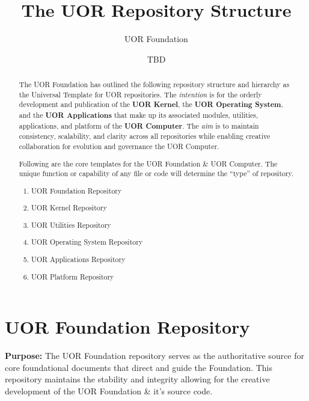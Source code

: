 \documentclass{article}
\title{The UOR Repository Structure}
\author{UOR Foundation}
\date{TBD}
\begin{document}
\maketitle

\begin{abstract}
The UOR Foundation has outlined the following repository structure and hierarchy as the Universal Template for UOR repositories.
The \textit{intention} is for the orderly development and publication of the \textbf{UOR Kernel}, the \textbf{UOR Operating System}, and the \textbf{UOR Applications} that make up its associated modules, utilities, applications, and platform of the \textbf{UOR Computer}.
The \textit{aim} is to maintain consistency, scalability, and clarity across all repositories while enabling creative collaboration for evolution and governance the UOR Computer.

Following are the core templates for the UOR Foundation \& UOR Computer.
The unique function or capability of any file or code will determine the ``type'' of repository.

\begin{tcolorbox}[title=UOR Foundation Core Templates]
    \begin{enumerate}
        \item{UOR Foundation Repository}
        \item{UOR Kernel Repository}
        \item{UOR Utilities Repository}
        \item{UOR Operating System Repository}
        \item{UOR Applications Repository}
        \item{UOR Platform Repository}
    \end{enumerate}
\end{tcolorbox}
\end{abstract}

\section{UOR Foundation Repository}
\textbf{Purpose:} The UOR Foundation repository serves as the authoritative source for core foundational documents that direct and guide the Foundation.
This repository maintains the stability and integrity allowing for the creative development of the UOR Foundation \& it's source code.
\end{document}

